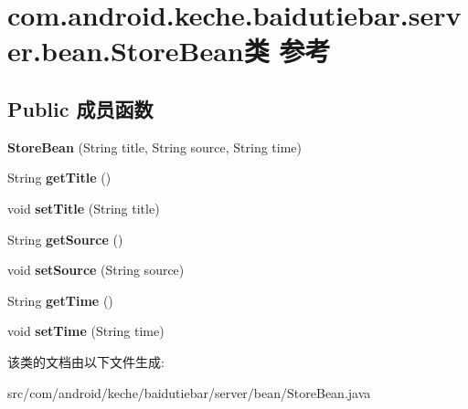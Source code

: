 \hypertarget{classcom_1_1android_1_1keche_1_1baidutiebar_1_1server_1_1bean_1_1_store_bean}{}\section{com.\+android.\+keche.\+baidutiebar.\+server.\+bean.\+Store\+Bean类 参考}
\label{classcom_1_1android_1_1keche_1_1baidutiebar_1_1server_1_1bean_1_1_store_bean}
\subsection*{Public 成员函数}
\begin{DoxyCompactItemize}
\item 
\mbox{\label{classcom_1_1android_1_1keche_1_1baidutiebar_1_1server_1_1bean_1_1_store_bean_a9c8963a67dd97a0f01f1fd76f69c33ca}} 
{\bfseries Store\+Bean} (String title, String source, String time)
\item 
\mbox{\label{classcom_1_1android_1_1keche_1_1baidutiebar_1_1server_1_1bean_1_1_store_bean_a51d99b898a6c3f3e2e5875ca69d2e875}} 
String {\bfseries get\+Title} ()
\item 
\mbox{\label{classcom_1_1android_1_1keche_1_1baidutiebar_1_1server_1_1bean_1_1_store_bean_aa878a0ef1a3c329806b8f375ccba7c8c}} 
void {\bfseries set\+Title} (String title)
\item 
\mbox{\label{classcom_1_1android_1_1keche_1_1baidutiebar_1_1server_1_1bean_1_1_store_bean_ac89b3b25096b463cd6a04f32e0db4000}} 
String {\bfseries get\+Source} ()
\item 
\mbox{\label{classcom_1_1android_1_1keche_1_1baidutiebar_1_1server_1_1bean_1_1_store_bean_a69bd372c79d799fd7c4f83d63d2dcec4}} 
void {\bfseries set\+Source} (String source)
\item 
\mbox{\label{classcom_1_1android_1_1keche_1_1baidutiebar_1_1server_1_1bean_1_1_store_bean_ac945cf9e850c2224698fdd9a5fad0677}} 
String {\bfseries get\+Time} ()
\item 
\mbox{\label{classcom_1_1android_1_1keche_1_1baidutiebar_1_1server_1_1bean_1_1_store_bean_a75b3aded52c6719a5a08a88239dc8722}} 
void {\bfseries set\+Time} (String time)
\end{DoxyCompactItemize}


该类的文档由以下文件生成\+:\begin{DoxyCompactItemize}
\item 
src/com/android/keche/baidutiebar/server/bean/Store\+Bean.\+java\end{DoxyCompactItemize}
